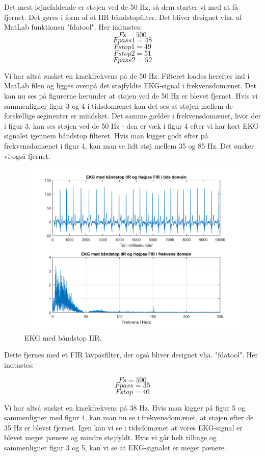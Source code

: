 \documentclass[12pt, letterpaper]{article}
\begin{document}
Det mest iøjnefaldende er støjen ved de 50 Hz, så dem starter vi med at få fjernet. Det gøres i form af et IIR båndstopfilter. Det bliver designet vha. af MatLab funktionen "fdatool". Her indtastes:
$$ Fs = 500 $$
$$ Fpass1 = 48 $$
$$ Fstop1 = 49 $$
$$ Fstop2 = 51 $$
$$ Fpass2 = 52 $$

Vi har altså ønsket en knækfrekvens på de 50 Hz. 
Filteret loades herefter ind i MatLab filen og ligges ovenpå det støjfyldte EKG-signal i frekvensdomænet. 
Det kan nu ses på figurerne herunder at støjen ved de 50 Hz er blevet fjernet. Hvis vi sammenligner figur 3 og 4 i tidsdomænet kan det ses at støjen mellem de forskellige segmenter er mindsket. Det samme gælder i frekvensdomænet, hvor der i figur 3, kan ses støjen ved de 50 Hz - den er væk i figur 4 efter vi har kørt EKG-signalet igennem båndstop filteret.  
Hvis man kigger godt efter på frekvensdomænet i figur 4, kan man se lidt støj mellem 35 og 85 Hz. Det ønsker vi også fjernet. 

\begin{figure}[H]
           \includegraphics[width=\linewidth]{billeder/EKGstopbandIIR}	   							\caption{EKG med båndstop IIR.}
\end{figure}

Dette fjernes med et FIR lavpasfilter, der også bliver designet vha. "fdatool". Her indtastes: 

$$ Fs = 500 $$
$$ Fpass = 35 $$
$$ Fstop = 40 $$

Vi har altså ønsket en knækfrekvens på 38 Hz. 
Hvis man kigger på figur 5 og sammenligner med figur 4, kan man nu se i frekvensdomænet, at støjen efter de 35 Hz er blevet fjernet.
Igen kan vi se i tidsdomænet at vores EKG-signal er blevet meget pænere og mindre støjfyldt. Hvis vi går helt tilbage og sammenligner figur 3 og 5, kan vi se at EKG-signalet er meget pænere. 
\end{document}
